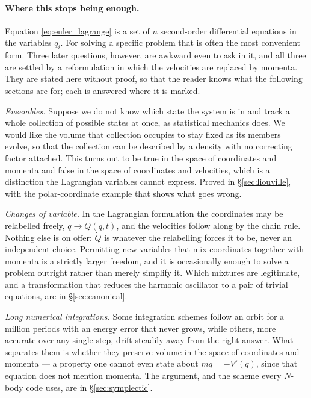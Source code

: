 \documentclass[12pt]{article}
\begin{document}
\paragraph{Where this stops being enough.}  Equation
\eqref{eq:euler_lagrange} is a set of $n$ second-order differential
equations in the variables $q_i$.  For solving a specific problem that
is often the most convenient form.  Three later questions, however, are
awkward even to ask in it, and all three are settled by a
reformulation in which the velocities are replaced by momenta.  They
are stated here without proof, so that the reader knows what the
following sections are for; each is answered where it is marked.

\emph{Ensembles.}  Suppose we do not know which state the system is in
and track a whole collection of possible states at once, as statistical
mechanics does.  We would like the volume that collection occupies to
stay fixed as its members evolve, so that the collection can be
described by a density with no correcting factor attached.  This turns
out to be true in the space of coordinates and momenta and false in the
space of coordinates and velocities, which is a distinction the
Lagrangian variables cannot express.  Proved in \S\ref{sec:liouville},
with the polar-coordinate example that shows what goes wrong.

\emph{Changes of variable.}  In the Lagrangian formulation the
coordinates may be relabelled freely, $q\to Q(q,t)$, and the velocities
follow along by the chain rule.  Nothing else is on offer: $\dot Q$ is
whatever the relabelling forces it to be, never an independent choice.
Permitting new variables that mix coordinates together with momenta is
a strictly larger freedom, and it is occasionally enough to solve a
problem outright rather than merely simplify it.  Which mixtures are
legitimate, and a transformation that reduces the harmonic oscillator
to a pair of trivial equations, are in \S\ref{sec:canonical}.

\emph{Long numerical integrations.}  Some integration schemes follow an
orbit for a million periods with an energy error that never grows,
while others, more accurate over any single step, drift steadily away
from the right answer.  What separates them is whether they preserve
volume in the space of coordinates and momenta --- a property one
cannot even state about $m\ddot q = -V'(q)$, since that equation does
not mention momenta.  The argument, and the scheme every $N$-body code
uses, are in \S\ref{sec:symplectic}.
\end{document}

